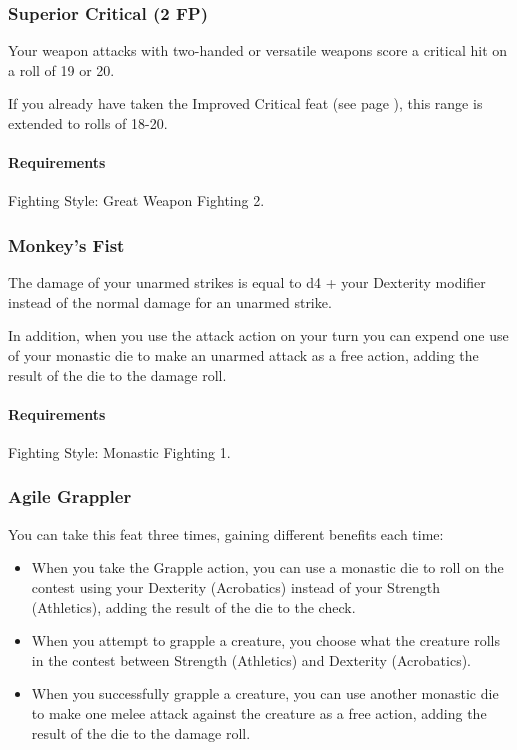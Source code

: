 \subsubsection{Superior Critical (2 FP)} \label{feat::superiorcritical}
    Your weapon attacks with two-handed or versatile weapons score a critical hit on a roll of 19 or 20.

    If you already have taken the Improved Critical feat (see page \pageref{feat::improvedcritical}), this range is extended to rolls of 18-20.
    \paragraph{Requirements} Fighting Style: Great Weapon Fighting 2.
\subsubsection{Monkey's Fist} \label{feat::monkeysfist}
    The damage of your unarmed strikes is equal to d4 + your Dexterity modifier instead of the normal damage for an unarmed strike.

    In addition, when you use the attack action on your turn you can expend one use of your monastic die to make an unarmed attack as a free action, adding the result of the die to the damage roll.
    \paragraph{Requirements} Fighting Style: Monastic Fighting 1.
\subsubsection{Agile Grappler} \label{feat::agilegrappler}
    You can take this feat three times, gaining different benefits each time:
    \begin{itemize}
        \item When you take the Grapple action, you can use a monastic die to roll on the contest using your Dexterity (Acrobatics) instead of your Strength (Athletics), adding the result of the die to the check.
        \item When you attempt to grapple a creature, you choose what the creature rolls in the contest between Strength (Athletics) and Dexterity (Acrobatics).
        \item When you successfully grapple a creature, you can use another monastic die to make one melee attack against the creature as a free action, adding the result of the die to the damage roll.
    \end{itemize}
